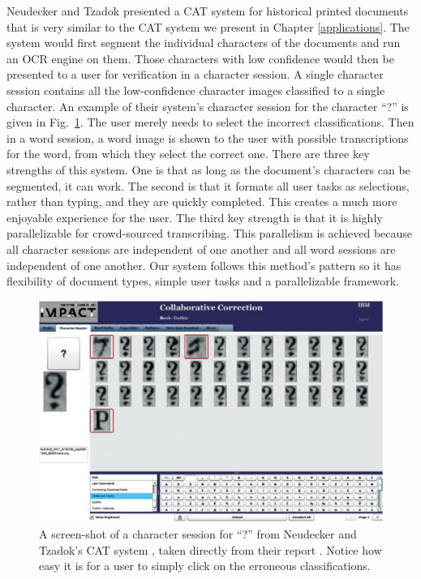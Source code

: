 \documentclass[ms,electronic,twosidetoc,letterpaper,chaptercenter,parttop,lol,lof,lot]{byumsphd}
\begin{document}
Neudecker and Tzadok \cite{Neudecker2010} presented a CAT system for historical printed documents that is very similar to the CAT system we present in Chapter \ref{applications}. The system would first segment the individual characters of the documents and run an OCR engine on them. Those characters with low confidence would then be presented to a user for verification in a character session. A single character session contains all the low-confidence character images classified to a single character. An example of their system's character session for the character ``?'' is given in Fig.~\ref{fig:carpet}.  The user merely needs to select the incorrect classifications. Then in a word session, a word image is shown to the user with possible transcriptions for the word, from which they select the correct one. There are three key strengths of this system. One is that as long as the document’s characters can be segmented, it can work. The second is that it formats all user tasks as selections, rather than typing, and they are quickly completed. This creates a much more enjoyable experience for the user. The third key strength is that it is highly parallelizable for crowd-sourced transcribing. This parallelism is achieved because all character sessions are independent of one another and all word sessions are independent of one another. Our system follows this method's pattern so it has flexibility of document types, simple user tasks and a parallelizable framework.

\begin{figure}
    \centering
    \includegraphics[width=.85\textwidth]{carpet}
    \caption{A screen-shot of a character session for ``?'' from Neudecker and Tzadok's CAT system \cite{Neudecker2010}, taken directly from their report \cite{Neudecker2010}. Notice how easy it is for a user to simply click on the erroneous classifications.}
    \label{fig:carpet}
\end{figure}
\end{document}
